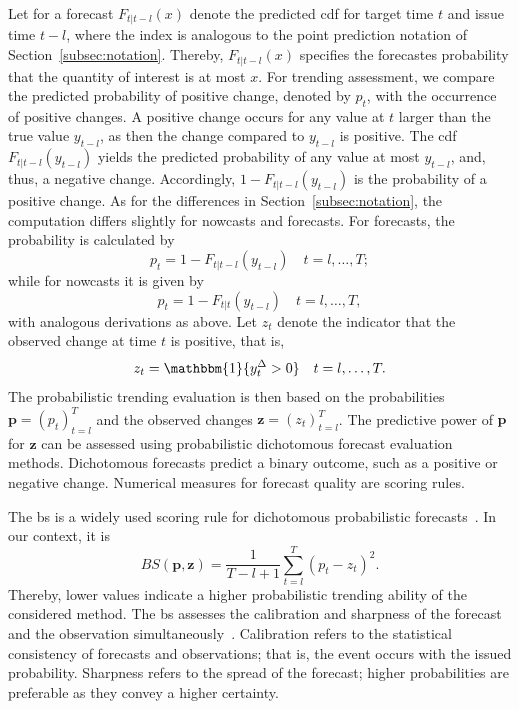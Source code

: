 \documentclass[pdflatex]{sn-jnl}
\theoremstyle{plain}%
\theoremstyle{definition}
\newcommand{\ind}[1]{\mathbbm{1}\{#1\}}
\newcommand{\diffyt}[1][t]{y^{\Delta}_{#1}}
\begin{document}
Let for a forecast $F_{t | t-l} (x)$ denote the predicted \ac{cdf} for target time $t$ and issue time $t - l$, where the index is analogous to the point prediction notation of Section~\ref{subsec:notation}.
Thereby, $F_{t | t-l} (x)$ specifies the forecastes probability that the quantity of interest is at most $x$.
For trending assessment, we compare the predicted probability of positive change, denoted by $p_t$, with the occurrence of positive changes.
A positive change occurs for any value at $t$ larger than the true value $y_{t-l}$, as then the change compared to $y_{t-l}$ is positive.
The \ac{cdf} $F_{t | t-l} (y_{t-l})$ yields the predicted probability of any value at most $y_{t-l}$, and, thus, a negative change.
Accordingly, $1 - F_{t | t-l} (y_{t-l})$ is the probability of a positive change.
As for the differences in Section~\ref{subsec:notation}, the computation differs slightly for nowcasts and forecasts.
For forecasts, the probability is calculated by
\begin{equation*}
    p_t = 1 - F_{t | t-l} (y_{t-l})\quad t = l, \dots, T;
\end{equation*}
while for nowcasts it is given by
\begin{equation*}
    p_t = 1 - F_{t | t} (y_{t-l})\quad t = l, \dots, T,
\end{equation*}
with analogous derivations as above.
Let $z_t$ denote the indicator that the observed change at time $t$ is positive, that is,
\begin{equation*}
    z_t = \ind{\diffyt > 0} \quad t = l, \dots, T.
\end{equation*}
The probabilistic trending evaluation is then based on the probabilities $\mathbf{p} = (p_t)_{t=l}^{T}$ and the observed changes $\mathbf{z} = (z_t)_{t=l}^{T}$.
The predictive power of $\mathbf{p}$ for $\mathbf{z}$ can be assessed using probabilistic dichotomous forecast evaluation methods.
Dichotomous forecasts predict a binary outcome, such as a positive or negative change.
Numerical measures for forecast quality are scoring rules.

The \ac{bs} is a widely used scoring rule for dichotomous probabilistic forecasts~\citep{Brier1950}.
In our context, it is
\begin{equation*}
    BS (\mathbf{p}, \mathbf{z}) = \frac{1}{T-l+1} \sum_{t=l}^{T} (p_t - z_t)^2.
\end{equation*}
Thereby, lower values indicate a higher probabilistic trending ability of the considered method.
The \ac{bs} assesses the calibration and sharpness of the forecast and the observation simultaneously~\citep{Ranjan2010,Mitchell2011}.
Calibration refers to the statistical consistency of forecasts and observations; that is, the event occurs with the issued probability.
Sharpness refers to the spread of the forecast; higher probabilities are preferable as they convey a higher certainty.
\end{document}
